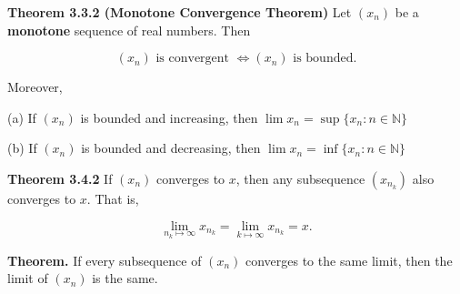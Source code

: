\documentclass[10pt,landscape]{article}
\begin{document}
\begin{multicols}{4}





\textbf{Theorem 3.3.2 (Monotone Convergence Theorem)} Let $(x_n)$ be a \textbf{monotone} sequence of real numbers. Then 

$$
(x_n) \text{ is convergent } \iff (x_n)  \text{ is bounded.}
$$

Moreover,

(a) If $(x_n)$ is bounded and increasing, then $\lim x_n = \sup \{ x_n: n \in \mathbb{N} \}$

(b) If $(x_n)$ is bounded and decreasing, then $\lim x_n = \inf \{ x_n: n \in \mathbb{N} \}$




\textbf{Theorem 3.4.2} If $(x_n)$ converges to $x$, then any subsequence $(x_{n_k})$ also converges to $x$. That is,

$$
\underset{n_k \mapsto \infty}{\lim} x_{n_k} = \underset{k \mapsto \infty}{\lim} x_{n_k} = x.
$$

\textbf{Theorem.} If every subsequence of $(x_n)$ converges to the same limit, then the limit of $(x_n)$ is the same.






\end{multicols}
\end{document}
